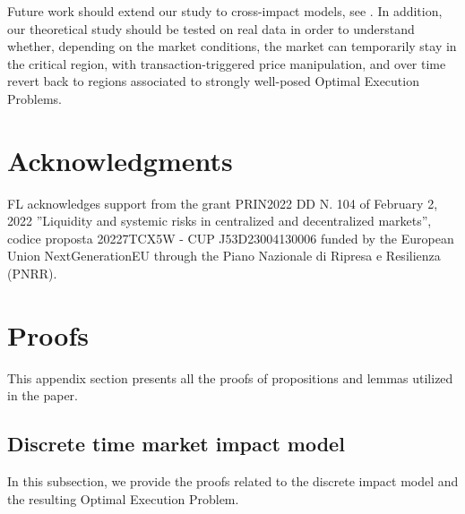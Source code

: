 \documentclass[final,3p,authoryear,12pt]{elsarticle}
\newcommand{\BeginAppendix}{\appendix}
\begin{document}
Future work should extend our study to cross-impact models, see \cite{mastromatteo2017trading, schneider2019cross}. In addition, our theoretical study should be tested on real data in order to understand whether, depending on the market conditions, the market can temporarily stay in the critical region, with transaction-triggered price manipulation, and over time revert back to regions associated to strongly well-posed Optimal Execution Problems. 

\section*{Acknowledgments}
FL acknowledges support from the grant PRIN2022 DD N. 104 of February 2, 2022 ”Liquidity and systemic risks in centralized and decentralized markets”, codice proposta 20227TCX5W - CUP J53D23004130006 funded by the European Union NextGenerationEU through the Piano Nazionale di Ripresa e Resilienza (PNRR).




\BeginAppendix
    
\section{Proofs}\label{app:proofs}

This appendix section presents all the proofs of propositions and lemmas utilized in the paper.

\subsection{Discrete time market impact model}

In this subsection, we provide the proofs related to the discrete impact model and the resulting Optimal Execution Problem.
\end{document}
